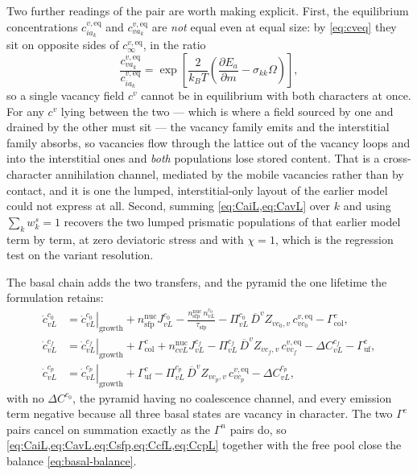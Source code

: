 \documentclass{article}
\begin{document}
Two further readings of the pair are worth making explicit. First, the
equilibrium concentrations $c^{v,\mathrm{eq}}_{ia_k}$ and
$c^{v,\mathrm{eq}}_{va_k}$ are \emph{not} equal even at equal size: by
\cref{eq:cveq} they sit on opposite sides of $c^{v,\mathrm{eq}}_{\infty}$, in the
ratio
\begin{equation}
  \frac{c^{v,\mathrm{eq}}_{va_k}}{c^{v,\mathrm{eq}}_{ia_k}}
   =\exp\!\left[\frac{2}{k_BT}
      \left(\frac{\partial E_{a}}{\partial m}-\sigma_{kk}\Omega\right)\right],
  \label{eq:eqratio}
\end{equation}
so a single vacancy field $c^v$ cannot be in equilibrium with both characters at
once. For any $c^v$ lying between the two --- which is where a field sourced by
one and drained by the other must sit --- the vacancy family emits and the
interstitial family absorbs, so vacancies flow through the lattice out of the
vacancy loops and into the interstitial ones and \emph{both} populations lose
stored content. That is a cross-character annihilation channel, mediated by the
mobile vacancies rather than by contact, and it is one the lumped,
interstitial-only layout of the earlier model could not express at all. Second, summing \cref{eq:CaiL,eq:CavL} over $k$ and using
$\sum_kw^s_k=1$ recovers the two lumped prismatic populations of that earlier
model term by term, at zero deviatoric stress and with $\chi=1$, which is the
regression test on the variant resolution.

The basal chain adds the two transfers, and the pyramid the one lifetime the
formulation retains:
\begin{align}
  \dot c^{c_0}_{vL} &= \left.\dot c^{c_0}_{vL}\right|_{\mathrm{growth}}
      +n^{\mathrm{nuc}}_{\mathrm{sfp}}J^{c_0}_{vL}
      -\frac{n^{\mathrm{nuc}}_{\mathrm{sfp}}\,n^{c_0}_{vL}}{\tau_{\mathrm{sfp}}}
      -\Pi^{c_0}_{vL}\,\overline D^{v}Z_{vc_0,v}\,c^{v,\mathrm{eq}}_{vc_0}
      -\Gamma^{c}_{\mathrm{col}},
  \label{eq:Csfp}\\
  \dot c^{c_f}_{vL} &= \left.\dot c^{c_f}_{vL}\right|_{\mathrm{growth}}
      +\Gamma^{c}_{\mathrm{col}}
      +n^{\mathrm{nuc}}_{cvL}J^{c_f}_{vL}
      -\Pi^{c_f}_{vL}\,\overline D^{v}Z_{vc_f,v}\,c^{v,\mathrm{eq}}_{vc_f}
      -\Delta C^{c_f}_{vL}
      -\Gamma^{c}_{\mathrm{uf}},
  \label{eq:CcfL}\\
  \dot c^{c_p}_{vL} &= \left.\dot c^{c_p}_{vL}\right|_{\mathrm{growth}}
      +\Gamma^{c}_{\mathrm{uf}}
      -\Pi^{c_p}_{vL}\,\overline D^{v}Z_{vc_p,v}\,c^{v,\mathrm{eq}}_{vc_p}
      -\Delta C^{c_p}_{vL},
  \label{eq:CcpL}
\end{align}
with no $\Delta C^{c_0}$, the pyramid having no coalescence channel, and every
emission term negative because all three basal states are vacancy in character.
The two $\Gamma^{c}$ pairs cancel on summation exactly as the $\Gamma^{n}$ pairs
do, so \cref{eq:CaiL,eq:CavL,eq:Csfp,eq:CcfL,eq:CcpL} together with the free pool
close the balance \cref{eq:basal-balance}.
\end{document}
